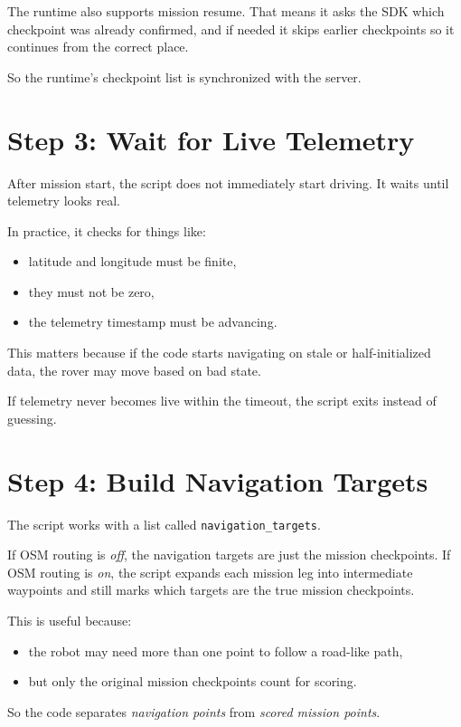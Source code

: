 \documentclass[11pt]{article}
\begin{document}
The runtime also supports mission resume.
That means it asks the SDK which checkpoint was already confirmed, and if needed it skips earlier checkpoints so it continues from the correct place.

So the runtime's checkpoint list is synchronized with the server.

\section*{Step 3: Wait for Live Telemetry}
After mission start, the script does not immediately start driving.
It waits until telemetry looks real.

In practice, it checks for things like:
\begin{itemize}[leftmargin=*]
\item latitude and longitude must be finite,
\item they must not be zero,
\item the telemetry timestamp must be advancing.
\end{itemize}

This matters because if the code starts navigating on stale or half-initialized data, the rover may move based on bad state.

If telemetry never becomes live within the timeout, the script exits instead of guessing.

\section*{Step 4: Build Navigation Targets}
The script works with a list called \texttt{navigation\_targets}.

If OSM routing is \emph{off}, the navigation targets are just the mission checkpoints.
If OSM routing is \emph{on}, the script expands each mission leg into intermediate waypoints and still marks which targets are the true mission checkpoints.

This is useful because:
\begin{itemize}[leftmargin=*]
\item the robot may need more than one point to follow a road-like path,
\item but only the original mission checkpoints count for scoring.
\end{itemize}

So the code separates \emph{navigation points} from \emph{scored mission points}.
\end{document}
